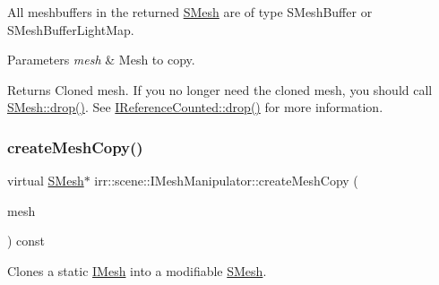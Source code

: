 All meshbuffers in the returned \hyperlink{structirr_1_1scene_1_1SMesh}{S\+Mesh} are of type S\+Mesh\+Buffer or S\+Mesh\+Buffer\+Light\+Map. 
\begin{DoxyParams}{Parameters}
{\em mesh} & Mesh to copy. \\
\hline
\end{DoxyParams}
\begin{DoxyReturn}{Returns}
Cloned mesh. If you no longer need the cloned mesh, you should call \hyperlink{classirr_1_1IReferenceCounted_a03856a09355b89d178090c4a5f738543}{S\+Mesh\+::drop()}. See \hyperlink{classirr_1_1IReferenceCounted_a03856a09355b89d178090c4a5f738543}{I\+Reference\+Counted\+::drop()} for more information. 
\end{DoxyReturn}
\mbox{\label{classirr_1_1scene_1_1IMeshManipulator_a3d2e7401f1d43919834a1bfe0b65e77f}} 
\subsubsection{\texorpdfstring{create\+Mesh\+Copy()}{createMeshCopy()}\hspace{0.1cm}{\footnotesize\ttfamily [2/2]}}
{\footnotesize\ttfamily virtual \hyperlink{structirr_1_1scene_1_1SMesh}{S\+Mesh}$\ast$ irr\+::scene\+::\+I\+Mesh\+Manipulator\+::create\+Mesh\+Copy (\begin{DoxyParamCaption}\item[{\hyperlink{classirr_1_1scene_1_1IMesh}{I\+Mesh} $\ast$}]{mesh }\end{DoxyParamCaption}) const\hspace{0.3cm}{\ttfamily [pure virtual]}}



Clones a static \hyperlink{classirr_1_1scene_1_1IMesh}{I\+Mesh} into a modifiable \hyperlink{structirr_1_1scene_1_1SMesh}{S\+Mesh}. 

